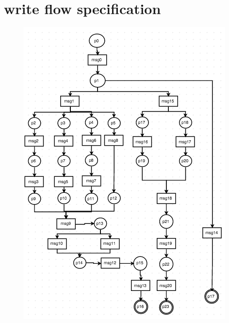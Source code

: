 \documentclass[conference]{IEEEtran}
\begin{document}
\section{write flow specification}


 \begin{figure} 
 \centerline{
 \includegraphics[width=3.4In]{figures/Fig5.png}}
 

\end{figure}
\end{document}
